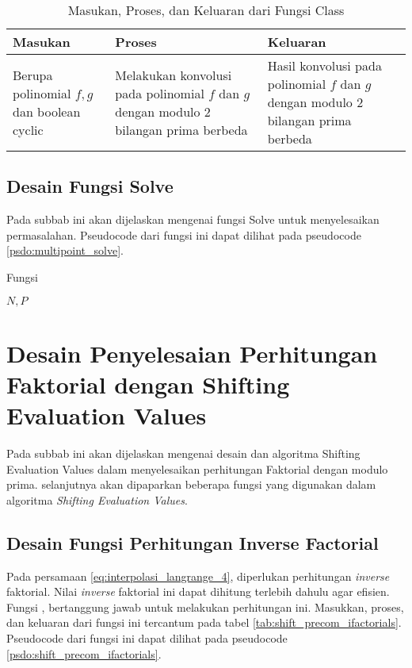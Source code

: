 \begin{table}[]	
	\Centering
	\begin{tabular}{|p{3cm}|p{3cm}|p{3cm}|}
	\hline
	Masukan & Proses & Keluaran \\ \hline
	Berupa polinomial $f, g$ dan boolean cyclic & Melakukan konvolusi pada polinomial $f$ dan $g$ dengan modulo $2$ bilangan prima berbeda & Hasil konvolusi pada polinomial $f$ dan $g$ dengan modulo $2$ bilangan prima berbeda \\ \hline
	\end{tabular}
	\caption{Masukan, Proses, dan Keluaran dari Fungsi  Class }
	\label{tab:class_poli_mul_convolve}
\end{table}

\newpage

\subsection{Desain Fungsi Solve}
Pada subbab ini akan dijelaskan mengenai fungsi Solve untuk menyelesaikan permasalahan. Pseudocode dari fungsi ini dapat dilihat pada pseudocode \ref{psdo:multipoint_solve}.

\begin{algorithm}
	\caption{Fungsi }
	\label{psdo:multipoint_solve}
	\begin{algorithmic}[1]
		\Require $ N, P$
		\State \Return {}
	\end{algorithmic}
\end{algorithm}

\newpage

\section{Desain Penyelesaian Perhitungan Faktorial dengan Shifting Evaluation Values}
Pada subbab ini akan dijelaskan mengenai desain dan algoritma Shifting Evaluation Values dalam menyelesaikan perhitungan Faktorial dengan modulo prima. selanjutnya akan dipaparkan beberapa fungsi yang digunakan dalam algoritma \textit{Shifting Evaluation Values}.

\subsection{Desain Fungsi Perhitungan Inverse Factorial}
Pada persamaan \eqref{eq:interpolasi_langrange_4}, diperlukan perhitungan \textit{inverse} faktorial. Nilai \textit{inverse} faktorial ini dapat dihitung terlebih dahulu agar efisien. Fungsi , bertanggung jawab untuk melakukan perhitungan ini.  Masukkan, proses, dan keluaran dari fungsi ini tercantum pada tabel \ref{tab:shift_precom_ifactorials}. Pseudocode dari fungsi ini dapat dilihat pada pseudocode \ref{psdo:shift_precom_ifactorials}.

